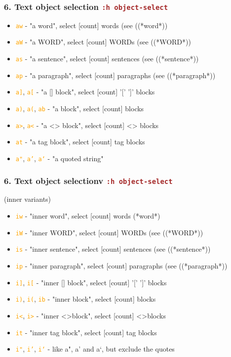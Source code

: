 \documentclass{beamer}
\newcommand{\vimcommand}[1]{\texttt{\textcolor{brown}{#1}}}
\newcommand{\vimmotion}[1]{\texttt{\textcolor{orange}{#1}}}
\newcommand{\vimhelp}[1]{\vimcommand{:h #1}}
\begin{document}
\begin{frame}
    \frametitle{6. Text object selection \vimhelp{object-select}}
    \begin{itemize}
        \item \vimmotion{aw} - "a word", select [count] words (see (\textrm(*word*))
        \item \vimmotion{aW} - "a WORD", select [count] WORDs (see (\textrm(*WORD*))
        \item \vimmotion{as} - "a sentence", select [count] sentences (see (\textrm(*sentence*))
        \item \vimmotion{ap} - "a paragraph", select [count] paragraphs (see (\textrm(*paragraph*))
        \item \vimmotion{a]}, \vimmotion{a[} - "a [] block", select [count] '[' ']' blocks
        \item \vimmotion{a)}, \vimmotion{a(}, \vimmotion{ab} - "a block", select [count] blocks
        \item \vimmotion{a\textgreater{}}, \vimmotion{a\textless{}} - "a \textless{}\textgreater{} block", select [count] \textless{}\textgreater{} blocks
        \item \vimmotion{at} - "a tag block", select [count] tag blocks
        \item \vimmotion{a"}, \vimmotion{a'}, \vimmotion{a`} - "a quoted string"
    \end{itemize}
\end{frame}

\begin{frame}
    \frametitle{6. Text object selectionv \vimhelp{object-select}}
    (inner variants)
    \begin{itemize}
        \item \vimmotion{iw}                                 - "inner word", select [count] words (\textrm{*word*})
        \item \vimmotion{iW}                                 - "inner WORD", select [count] WORDs (see (\textrm(*WORD*))
        \item \vimmotion{is}                                 - "inner sentence", select [count] sentences (see (\textrm(*sentence*))
        \item \vimmotion{ip}                                 - "inner paragraph", select [count] paragraphs (see (\textrm(*paragraph*))
        \item \vimmotion{i]}, \vimmotion{i[}                 - "inner [] block", select [count] '[' ']' blocks
        \item \vimmotion{i)}, \vimmotion{i(}, \vimmotion{ib} - "inner block", select [count] blocks
        \item \vimmotion{i\textless}, \vimmotion{i\textgreater} - "inner \textless\textgreater block", select [count] \textless\textgreater blocks
        \item \vimmotion{it}                                 - "inner tag block", select [count] tag blocks
        \item \vimmotion{i"}, \vimmotion{i'}, \vimmotion{i`} - like a", a' and a`, but exclude the quotes
    \end{itemize}
\end{frame}
\end{document}
